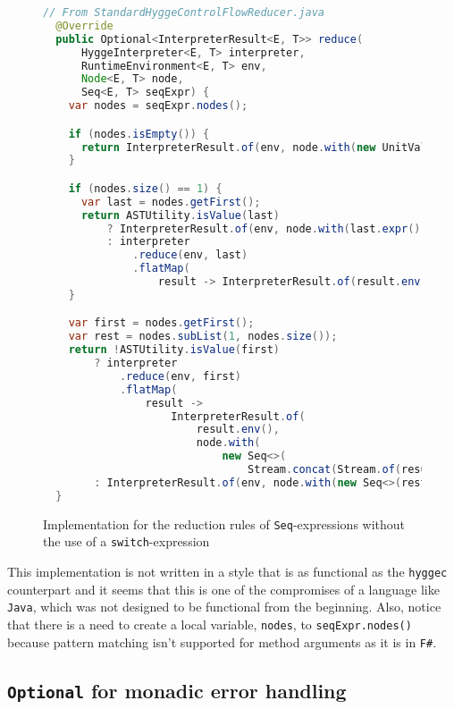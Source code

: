 \begin{figure}[H]
\centering
\begin{lstlisting}[language=Java]
  // From StandardHyggeControlFlowReducer.java
  @Override
  public Optional<InterpreterResult<E, T>> reduce(
      HyggeInterpreter<E, T> interpreter,
      RuntimeEnvironment<E, T> env,
      Node<E, T> node,
      Seq<E, T> seqExpr) {
    var nodes = seqExpr.nodes();

    if (nodes.isEmpty()) {
      return InterpreterResult.of(env, node.with(new UnitVal<>()));
    }

    if (nodes.size() == 1) {
      var last = nodes.getFirst();
      return ASTUtility.isValue(last)
          ? InterpreterResult.of(env, node.with(last.expr()))
          : interpreter
              .reduce(env, last)
              .flatMap(
                  result -> InterpreterResult.of(result.env(), node.with(result.node().expr())));
    }

    var first = nodes.getFirst();
    var rest = nodes.subList(1, nodes.size());
    return !ASTUtility.isValue(first)
        ? interpreter
            .reduce(env, first)
            .flatMap(
                result ->
                    InterpreterResult.of(
                        result.env(),
                        node.with(
                            new Seq<>(
                                Stream.concat(Stream.of(result.node()), rest.stream()).toList()))))
        : InterpreterResult.of(env, node.with(new Seq<>(rest)));
  }
\end{lstlisting}
\caption{Implementation for the reduction rules of \texttt{Seq}-expressions without the use of a \texttt{switch}-expression}
\label{fig:seq_reduce_implementation}
\end{figure}

This implementation is not written in a style that is as functional as the \texttt{hyggec} counterpart and it seems that
this is one of the compromises of a language like \texttt{Java}, which was not designed to be functional from the beginning.
Also, notice that there is a need to create a local variable, \texttt{nodes}, to \texttt{seqExpr.nodes()} because pattern
matching isn't supported for method arguments as it is in \texttt{F\#}.

\subsection{\texttt{Optional} for monadic error handling}

